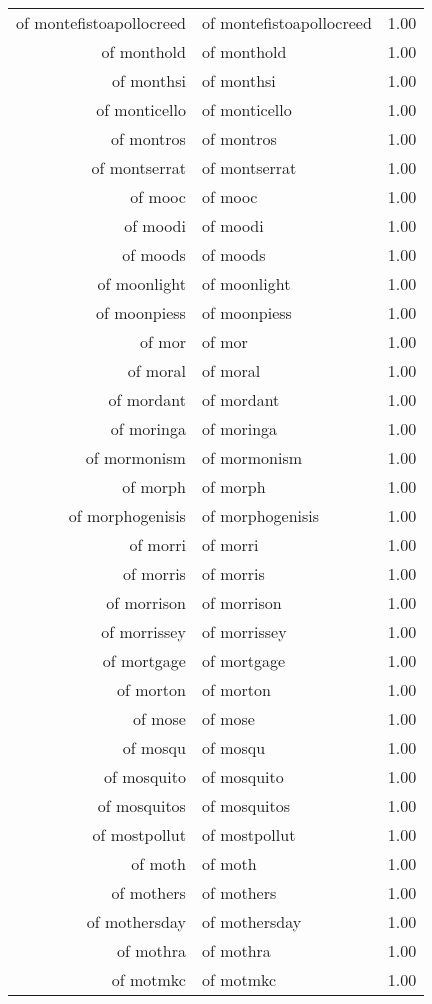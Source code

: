 \begin{table}[ht]
\begin{tabular}{rlr}
  of montefistoapollocreed & of montefistoapollocreed & 1.00 \\ 
  of monthold & of monthold & 1.00 \\ 
  of monthsi & of monthsi & 1.00 \\ 
  of monticello & of monticello & 1.00 \\ 
  of montros & of montros & 1.00 \\ 
  of montserrat & of montserrat & 1.00 \\ 
  of mooc & of mooc & 1.00 \\ 
  of moodi & of moodi & 1.00 \\ 
  of moods & of moods & 1.00 \\ 
  of moonlight & of moonlight & 1.00 \\ 
  of moonpiess & of moonpiess & 1.00 \\ 
  of mor & of mor & 1.00 \\ 
  of moral & of moral & 1.00 \\ 
  of mordant & of mordant & 1.00 \\ 
  of moringa & of moringa & 1.00 \\ 
  of mormonism & of mormonism & 1.00 \\ 
  of morph & of morph & 1.00 \\ 
  of morphogenisis & of morphogenisis & 1.00 \\ 
  of morri & of morri & 1.00 \\ 
  of morris & of morris & 1.00 \\ 
  of morrison & of morrison & 1.00 \\ 
  of morrissey & of morrissey & 1.00 \\ 
  of mortgage & of mortgage & 1.00 \\ 
  of morton & of morton & 1.00 \\ 
  of mose & of mose & 1.00 \\ 
  of mosqu & of mosqu & 1.00 \\ 
  of mosquito & of mosquito & 1.00 \\ 
  of mosquitos & of mosquitos & 1.00 \\ 
  of mostpollut & of mostpollut & 1.00 \\ 
  of moth & of moth & 1.00 \\ 
  of mothers & of mothers & 1.00 \\ 
  of mothersday & of mothersday & 1.00 \\ 
  of mothra & of mothra & 1.00 \\ 
  of motmkc & of motmkc & 1.00 \\ 

\end{tabular}
\end{table}
